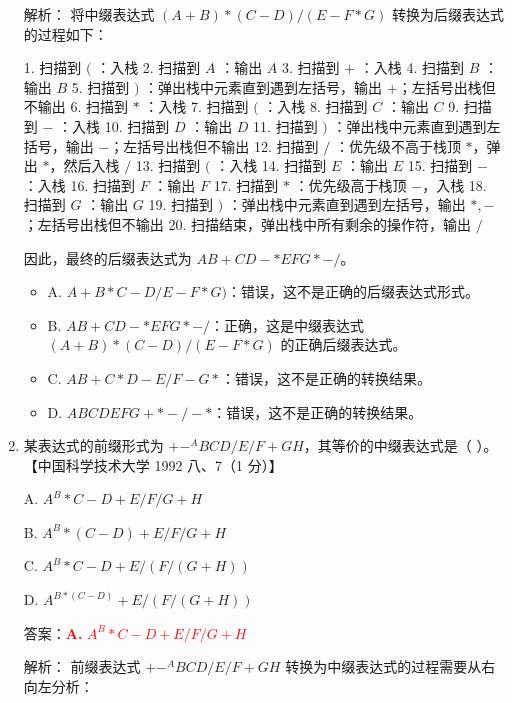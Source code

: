 \documentclass[lang=cn,newtx,10pt,scheme=chinese]{../../../elegantbook}
\begin{document}
\begin{enumerate}
    解析：
    将中缀表达式 $(A + B) * (C - D) / (E - F * G)$ 转换为后缀表达式的过程如下：

    1. 扫描到 $($ ：入栈
    2. 扫描到 $A$ ：输出 $A$
    3. 扫描到 $+$ ：入栈
    4. 扫描到 $B$ ：输出 $B$
    5. 扫描到 $)$ ：弹出栈中元素直到遇到左括号，输出 $+$；左括号出栈但不输出
    6. 扫描到 $*$ ：入栈
    7. 扫描到 $($ ：入栈
    8. 扫描到 $C$ ：输出 $C$
    9. 扫描到 $-$ ：入栈
    10. 扫描到 $D$ ：输出 $D$
    11. 扫描到 $)$ ：弹出栈中元素直到遇到左括号，输出 $-$；左括号出栈但不输出
    12. 扫描到 $/$ ：优先级不高于栈顶 $*$，弹出 $*$，然后入栈 $/$
    13. 扫描到 $($ ：入栈
    14. 扫描到 $E$ ：输出 $E$
    15. 扫描到 $-$ ：入栈
    16. 扫描到 $F$ ：输出 $F$
    17. 扫描到 $*$ ：优先级高于栈顶 $-$，入栈
    18. 扫描到 $G$ ：输出 $G$
    19. 扫描到 $)$ ：弹出栈中元素直到遇到左括号，输出 $*,-$；左括号出栈但不输出
    20. 扫描结束，弹出栈中所有剩余的操作符，输出 $/$

    因此，最终的后缀表达式为 $AB+CD-*EFG*-/$。

    \begin{itemize}
        \item A. $A + B* C - D / E - F * G)$：错误，这不是正确的后缀表达式形式。
        \item B. $AB+CD-*EFG*-/$：正确，这是中缀表达式 $(A + B) * (C - D) / (E - F * G)$ 的正确后缀表达式。
        \item C. $AB+C*D-E/F-G*$：错误，这不是正确的转换结果。
        \item D. $ABCDEFG+*-/-*$：错误，这不是正确的转换结果。
    \end{itemize}

    \item 某表达式的前缀形式为 $+- ^ABCD/E/F + GH$，其等价的中缀表达式是（ ）。  
    【中国科学技术大学 1992 八、7（1 分）】  

    A. $A^B*C-D+E/F/G+H$  

    B. $A^B*(C-D) + E/F/G + H$  

    C. $A^B*C-D+E/(F/(G+H))$  

    D. $A^{B*(C-D)} +E/(F/(G+H))$  

    答案：\textcolor{red}{\textbf{A.} $A^B*C-D+E/F/G+H$}

    解析：
    前缀表达式 $+- ^ABCD/E/F + GH$ 转换为中缀表达式的过程需要从右向左分析：


\end{enumerate}
\end{document}
